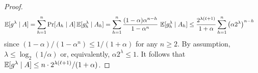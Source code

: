\begin{proof}
        \begin{align*}
            \operatorname{\mathbb{E}} [g^\lambda \mid A]
                &=
                \sum_{h = 1}^n \Pr[A_h \mid A] 
                    \operatorname{\mathbb{E}} [g_h^\lambda \mid A_h] 
                =
                \sum_{h = 1}^n 
                    \frac{(1 - \alpha) \alpha^{n-h}}{1 - \alpha^n}\,
                    \operatorname{\mathbb{E}} [g_h^\lambda \mid A_h] 
                \leq 
                    \frac{2^{\lambda(\ell + 1)}}{1+\alpha}
                    \sum_{h=1}^n 
                    \left( \alpha 2^\lambda \right)^{n-h} 
        \end{align*}
        since $(1 - \alpha)/(1 - \alpha^n) \leq 1/(1 + \alpha)$ for any $n \geq 2$. 
        By assumption, $\lambda \leq \log_2(1/\alpha)$ or, 
        equivalently, $\alpha 2^\lambda \leq 1$.
        It follows that 
        $
            \operatorname{\mathbb{E}} [g^\lambda \mid A] \leq  n \cdot 2^{\lambda(\ell + 1)}/(1+\alpha)
        $.
    \end{proof}


